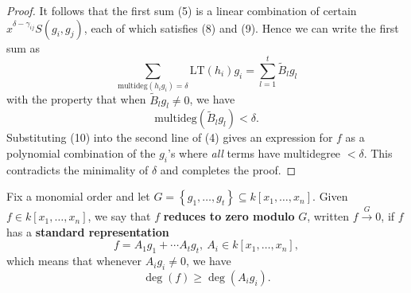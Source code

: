 \begin{proof}
  It follows that the first sum (5) is a linear combination of certain $x^{\delta - \gamma_{ij}} S(g_i, g_j)$, each of which satisfies (8) and (9). Hence we can write the first sum as
  \begin{equation} \tag{10}
  \sum_{\text{multideg}(h_i g_i) = \delta} \text{LT}(h_i) g_i = \sum_{l=1}^t \tilde{B}_l g_l
  \end{equation}
  with the property that when $\tilde{B}_l g_l \ne 0$, we have
  \begin{equation} \tag{11}
  \text{multideg}(\tilde{B}_l g_l) < \delta.
  \end{equation}
  Substituting (10) into the second line of (4) gives an expression for $f$ as a polynomial combination of the $g_i$'s where \textit{all} terms have multidegree $<\delta$. This contradicts the minimality of $\delta$ and completes the proof.
\end{proof}

\begin{definition}\label{def:reduces_to_zero} %
  \leanok
  Fix a monomial order and let $G = \left\{g_1, \ldots , g_t\right\} \subseteq k[x_1, \ldots , x_n]$.
  Given $f \in k[x_1, \ldots , x_n]$, we say that $f$ \textbf{reduces to zero modulo} $G$, written $f \xrightarrow{G} 0$,
  if $f$ has a \textbf{standard representation}
  \[ f = A_1g_1 + \cdots A_tg_t,\ A_i \in k[x_1, \ldots , x_n],\]
  which means that whenever $A_ig_i \neq 0$, we have
  \[\operatorname{deg}(f) \geq \operatorname{deg}(A_ig_i).\]
\end{definition}

